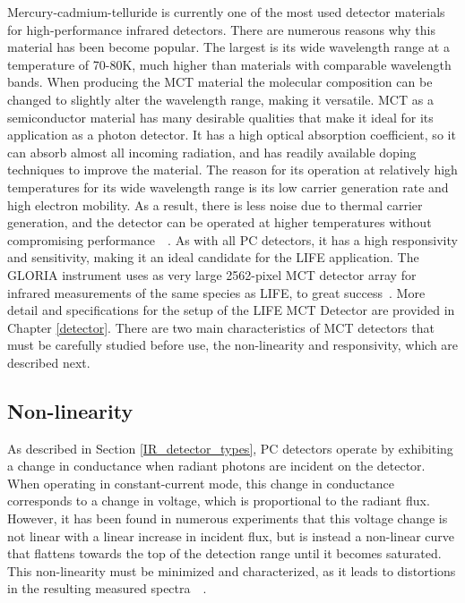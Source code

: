 Mercury-cadmium-telluride is currently one of the most used detector materials for high-performance infrared detectors. There are numerous reasons why this material has been become popular. The largest is its wide wavelength range at a temperature of 70-80K, much higher than materials with comparable wavelength bands. When producing the MCT material the molecular composition can be changed to slightly alter the wavelength range, making it versatile. MCT as a semiconductor material has many desirable qualities that make it ideal for its application as a photon detector. It has a high optical absorption coefficient, so it can absorb almost all incoming radiation, and has readily available doping techniques to improve the material. The reason for its operation at relatively high temperatures for its wide wavelength range is its low carrier generation rate and high electron mobility. As a result, there is less noise due to thermal carrier generation, and the detector can be operated at higher temperatures without compromising performance~\citep{mct_detector_text_new}~\citep{mct_detector_text_old}. As with all PC detectors, it has a high responsivity and sensitivity, making it an ideal candidate for the LIFE application. The GLORIA instrument uses as very large 2562-pixel MCT detector array for infrared measurements of the same species as LIFE, to great success~\citep{GLORIA_concept}. More detail and specifications for the setup of the LIFE MCT Detector are provided in Chapter \ref{detector}. There are two main characteristics of MCT detectors that must be carefully studied before use, the non-linearity and responsivity, which are described next.

\subsection{Non-linearity}\label{non-linerity}
As described in Section \ref{IR_detector_types}, PC detectors operate by exhibiting a change in conductance when radiant photons are incident on the detector. When operating in constant-current mode, this change in conductance corresponds to a change in voltage, which is proportional to the radiant flux. However, it has been found in numerous experiments that this voltage change is not linear with a linear increase in incident flux, but is instead a non-linear curve that flattens towards the top of the detection range until it becomes saturated. This non-linearity must be minimized and characterized, as it leads to distortions in the resulting measured spectra~\citep{MCT_linearity}~\citep{ele_inf_IR_signal_nonlinearity}.

